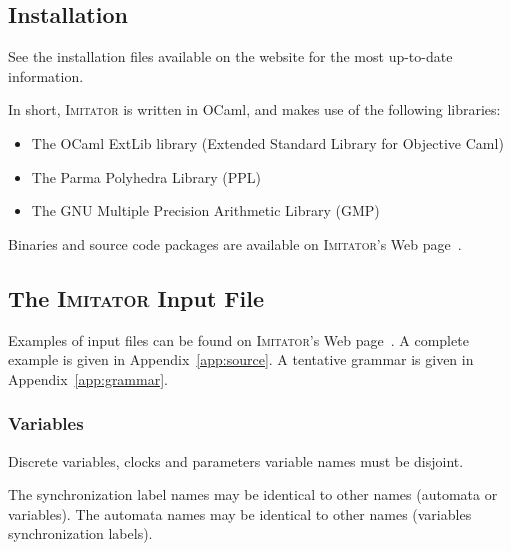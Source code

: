 \documentclass[a4paper,11pt]{article}
\newcommand{\imitator}{\textsc{Imitator}}
\newcommand{\ocaml}{OCaml}
\begin{document}
\subsection{Installation}

See the installation files available on the website for the most up-to-date information.

In short, \imitator{} is written in \ocaml{}, and makes use of the following libraries:

\begin{itemize}
	\item The OCaml ExtLib library (Extended Standard Library for Objective Caml)
	\item The Parma Polyhedra Library (PPL)~\cite{bhz08}
        \item The GNU Multiple Precision Arithmetic Library (GMP)
\end{itemize}

Binaries and source code packages are available on \imitator{}'s Web page~\cite{imitator}.



\subsection{The \imitator{} Input File}

Examples of input files can be found on \imitator{}'s Web page~\cite{imitator}.
A complete example is given in Appendix~\ref{app:source}.
A tentative grammar is given in Appendix~\ref{app:grammar}.


\subsubsection{Variables}


Discrete variables, clocks and parameters variable names must be disjoint.

The synchronization label names may be identical to other names (automata or variables).
The automata names may be identical to other names (variables synchronization labels).
\end{document}
